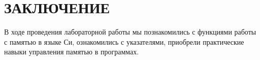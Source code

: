\section*{ЗАКЛЮЧЕНИЕ}

В ходе проведения лабораторной работы мы познакомились с функциями работы
с памятью в языке Си, ознакомились с указателями, приобрели практические
навыки управления памятью в программах. 

\newpage


